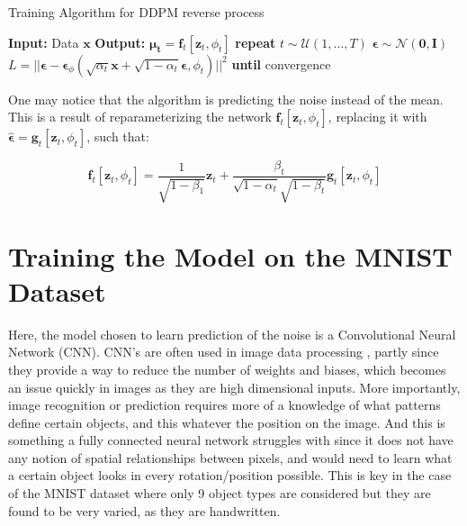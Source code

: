 \documentclass[12pt]{report} %
\begin{document}
\begin{definitionbox}{Training Algorithm for DDPM reverse process \cite{ho2020denoising}}
  \begin{algorithmic}[1]
    \State \textbf{Input:} Data $\mathbf{x}$
    \State \textbf{Output:} $\mathbf{\mu_{t}} = \mathbf{f}_{t}[\mathbf{z}_{t},\phi_{t}]$
    \State \textbf{repeat}
       
        \State $t \sim \mathcal{U}(1, \dots, T)$ 
        \State $\mathbf{\epsilon} \sim \mathcal{N}(\mathbf{0}, \mathbf{I})$ 
        \State $L = ||\mathbf{\epsilon} - \mathbf{\epsilon}_{\phi}(\sqrt{\alpha_{t}}\mathbf{x} + \sqrt{1 - \alpha_{t}}\mathbf{\epsilon}, \phi_{t})||^{2}$ 
      \EndFor {}
    \State \textbf{until} convergence
  \end{algorithmic}
\end{definitionbox}

One may notice that the algorithm is predicting the noise instead of the mean. This is a result of reparameterizing the network $\mathbf{f}_{t}[\mathbf{z}_{t}, \phi_{t}]$\cite{ho2020denoising}, replacing it with $\hat{\mathbf{\epsilon}} = \mathbf{g}_{t}[\mathbf{z}_{t}, \phi_{t}]$, such that\cite[pp.361-362]{prince2023understanding}:

\begin{equation}
  \mathbf{f}_{t}[\mathbf{z}_{t}, \phi_{t}] =  \frac{1}{\sqrt{1 - \beta_{1}}}\mathbf{z}_{t} + \frac{\beta_{t}}{\sqrt{1 - \alpha_{t}}\sqrt{1 - \beta_{t}}} \mathbf{g}_{t}[\mathbf{z}_{t}, \phi_{t}]
\end{equation}


\section{Training the Model on the MNIST Dataset}

Here, the model chosen to learn prediction of the noise is a Convolutional Neural Network (CNN). CNN's are often used in image data processing \cite[p.161]{prince2023understanding}, partly since they provide a way to reduce the number of weights and biases, which becomes an issue quickly in images as they are high dimensional inputs. More importantly, image recognition or prediction requires more of a knowledge of what patterns define certain objects, and this whatever the position on the image. And this is something a fully connected neural network struggles with since it does not have any notion of spatial relationships between pixels, and would need to learn what a certain object looks in every rotation/position possible. This is key in the case of the MNIST dataset where only 9 object types are considered but they are found to be very varied, as they are handwritten.
\end{document}
